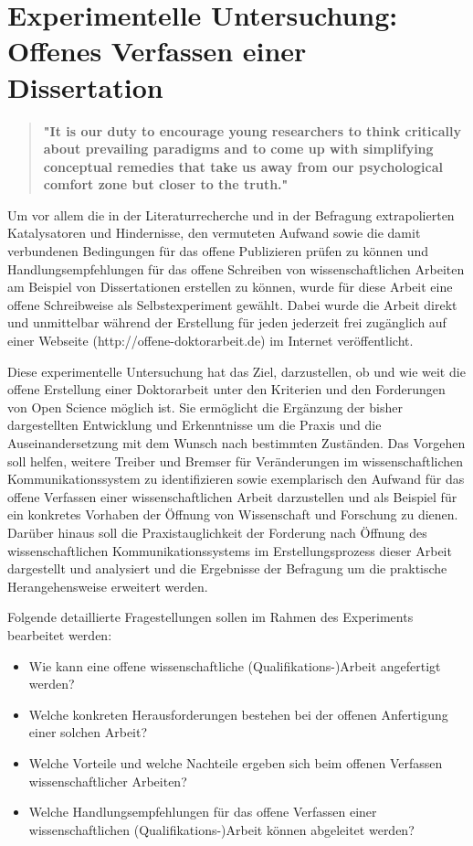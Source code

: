 \chapter{Experimentelle Untersuchung: Offenes Verfassen einer Dissertation}

\begin{quote}
\textbf{"It is our duty to encourage young researchers to think critically about prevailing paradigms and to come up with simplifying conceptual remedies that take us away from our psychological comfort zone but closer to the truth."}
\end{quote} \cite[:386]{Loeb_2013}

Um vor allem die in der Literaturrecherche und in der Befragung extrapolierten Katalysatoren und Hindernisse, den vermuteten Aufwand sowie die damit verbundenen Bedingungen für das offene Publizieren prüfen zu können und Handlungsempfehlungen für das offene Schreiben von wissenschaftlichen Arbeiten am Beispiel von Dissertationen erstellen zu können, wurde für diese Arbeit eine offene Schreibweise als Selbstexperiment gewählt. Dabei wurde die Arbeit direkt und unmittelbar während der Erstellung für jeden jederzeit frei zugänglich auf einer Webseite (http://offene-doktorarbeit.de) im Internet veröffentlicht.

Diese experimentelle Untersuchung hat das Ziel, darzustellen, ob und wie weit die offene Erstellung einer Doktorarbeit unter den Kriterien und den Forderungen von Open Science möglich ist. Sie ermöglicht die Ergänzung der bisher dargestellten Entwicklung und Erkenntnisse um die Praxis und die Auseinandersetzung mit dem Wunsch nach bestimmten Zuständen. Das Vorgehen soll helfen, weitere Treiber und Bremser für Veränderungen im wissenschaftlichen Kommunikationssystem zu identifizieren sowie exemplarisch den Aufwand für das offene Verfassen einer wissenschaftlichen Arbeit darzustellen und als Beispiel für ein konkretes Vorhaben der Öffnung von Wissenschaft und Forschung zu dienen. Darüber hinaus soll die Praxistauglichkeit der Forderung nach Öffnung des wissenschaftlichen Kommunikationssystems im Erstellungsprozess dieser Arbeit dargestellt und analysiert und die Ergebnisse der Befragung um die praktische Herangehensweise erweitert werden.

Folgende detaillierte Fragestellungen sollen im Rahmen des Experiments bearbeitet werden:
\begin{itemize}
\item Wie kann eine offene wissenschaftliche (Qualifikations-)Arbeit angefertigt werden?
\item Welche konkreten Herausforderungen bestehen bei der offenen Anfertigung einer solchen Arbeit?
\item Welche Vorteile und welche Nachteile ergeben sich beim offenen Verfassen wissenschaftlicher Arbeiten?
\item Welche Handlungsempfehlungen für das offene Verfassen einer wissenschaftlichen (Qualifikations-)Arbeit können abgeleitet werden?
\end{itemize}

